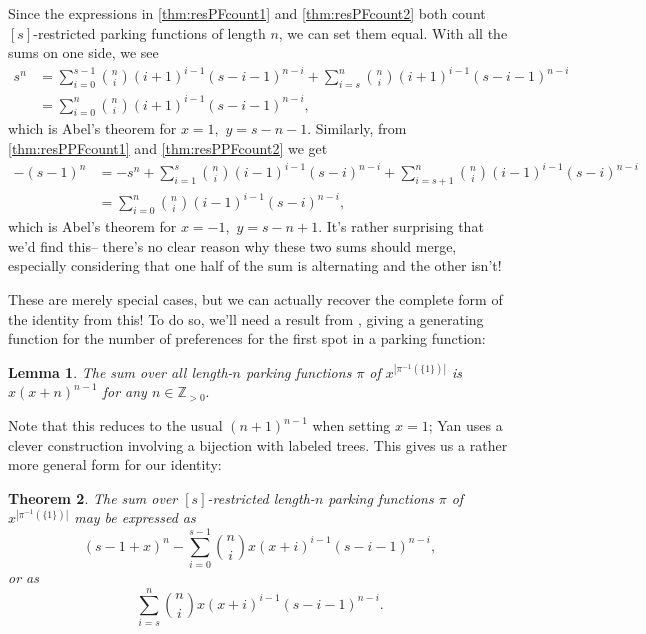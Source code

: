 \documentclass[12 pt]{amsart}
\newtheorem{theorem}{Theorem}[section]
\newtheorem{lemma}[theorem]{Lemma}
\theoremstyle{definition} %
\theoremstyle{remark} %
\begin{document}
Since the expressions in \cref{thm:resPFcount1} and \cref{thm:resPFcount2} both count $[s]$-restricted parking functions of length $n$, we can set them equal. With all the sums on one side, we see
\begin{align*}
    s^{n} &= \sum_{i = 0}^{s - 1} \binom{n}{i} (i + 1)^{i - 1} (s - i - 1)^{n - i} + \sum_{i = s}^{n} \binom{n}{i} (i + 1)^{i - 1} (s - i - 1)^{n - i}\\
    &=\sum_{i = 0}^{n} \binom{n}{i} (i + 1)^{i - 1} (s - i - 1)^{n - i},
\end{align*}
which is Abel's theorem for $x=1,$ $y=s-n-1.$ Similarly, from \cref{thm:resPPFcount1} and \cref{thm:resPPFcount2} we get 
\begin{align*}
    - (s - 1)^{n} &= -s^n + \sum_{i = 1}^{s} \binom{n}{i} (i - 1)^{i - 1} (s - i)^{n - i} + \sum_{i = s + 1}^{n} \binom{n}{i} (i - 1)^{i - 1} (s - i)^{n - i}\\
    &=\sum_{i=0}^n \binom{n}{i} (i - 1)^{i - 1} (s - i)^{n - i},
\end{align*}
which is Abel's theorem for $x=-1,$ $y=s-n+1$. It's rather surprising that we'd find this-- there's no clear reason why these two sums should merge, especially considering that one half of the sum is alternating and the other isn't!

These are merely special cases, but we can actually recover the complete form of the identity from this! To do so, we'll need a result from \cite{yan-survey-2015}, giving a generating function for the number of preferences for the first spot in a parking function: %

\begin{lemma}
    The sum over all length-$n$ parking functions $\pi$ of $x^{|\pi^{-1}(\{1\})|}$ is $x(x+n)^{n-1}$ for any $n\in\mathbb{Z}_{>0}.$
\end{lemma}

Note that this reduces to the usual $(n+1)^{n-1}$ when setting $x=1$; Yan uses a clever construction involving a bijection with labeled trees. This gives us a rather more general form for our identity:

\begin{theorem}
    \label{thm:res-1s-enumerator}
    The sum over $[s]$-restricted length-$n$ parking functions $\pi$ of $x^{|\pi^{-1}(\{1\})|}$ may be expressed as
    \[(s-1+x)^{n} - \sum_{i = 0}^{s - 1} \binom{n}{i} x(x + i)^{i - 1} (s - i - 1)^{n - i},\]
    or as
    \[\sum_{i = s}^{n} \binom{n}{i} x(x + i)^{i - 1} (s - i - 1)^{n - i}.\]
\end{theorem}
\end{document}

